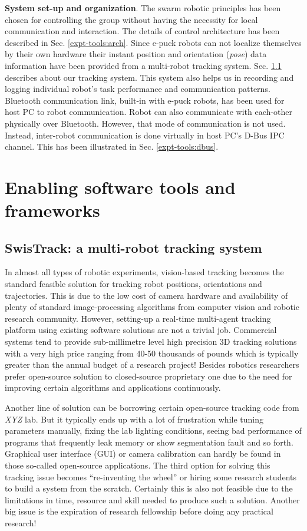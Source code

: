 \textbf{System set-up and organization}. The swarm robotic principles has been chosen for controlling the group without having the necessity for local communication and interaction. The details of control architecture has been described in Sec. \ref{expt-tools:arch}. Since e-puck robots can not localize themselves by their own hardware  their instant position and orientation ({\em pose}) data information have been provided from a multi-robot tracking system. Sec. \ref{expt-tools:swistrack} describes about our tracking system. This system also helps us in recording and logging individual robot's task performance and communication patterns. Bluetooth communication link, built-in with e-puck robots, has been used for host PC to robot communication. Robot can also communicate with each-other physically over Bluetooth. However, that mode of communication is not used. Instead, inter-robot communication is done virtually in host PC's D-Bus IPC channel. This has been illustrated in Sec. \ref{expt-tools:dbus}.
\section{Enabling software tools and frameworks}
\subsection{SwisTrack: a multi-robot tracking system}
\label{expt-tools:swistrack}
In almost all types of robotic experiments, vision-based tracking becomes the standard feasible solution for tracking robot positions, orientations and trajectories. This is due to the low cost of camera hardware and availability of plenty of standard image-processing algorithms from computer vision and robotic research community. However, setting-up a real-time multi-agent tracking platform using existing software solutions are not a trivial job. Commercial systems tend to provide sub-millimetre level high precision 3D tracking solutions with a very high price ranging from  40-50 thousands of pounds which is typically greater than the annual budget of a research project! Besides robotics researchers prefer open-source solution to closed-source proprietary one due to the need for improving certain algorithms and applications continuously. 

Another line of solution can be borrowing certain open-source tracking code from \textit{XYZ} lab. But it typically ends up with a lot of frustration while tuning parameters manually, fixing the lab lighting conditions, seeing bad performance of programs that frequently leak memory or show segmentation fault and so forth. Graphical user interface (GUI) or camera calibration can hardly be found in those so-called open-source applications. The third option for solving this tracking issue becomes ``re-inventing the wheel'' or hiring some research students to build a system from the scratch. Certainly this is also not feasible due to the limitations in time, resource and skill needed to produce such a solution. Another big issue is the expiration of research fellowship before doing any practical research!

